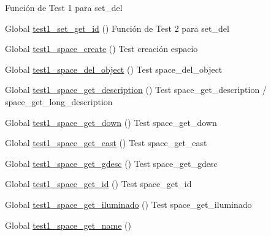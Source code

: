 \begin{DoxyRefList}
%
Función de Test 1 para set\+\_\+del  
\item[Global \mbox{\hyperlink{set__test_8c_af5b80896afe0d23ab4a347bdb4b3c48b}{test1\+\_\+set\+\_\+get\+\_\+id}} ()]\label{test__test000148}%
%
Función de Test 2 para set\+\_\+del  
\item[Global \mbox{\hyperlink{space__test_8c_a69278cc022dc5688d4725f8d36317b30}{test1\+\_\+space\+\_\+create}} ()]\label{test__test000150}%
%
Test creación espacio  
\item[Global \mbox{\hyperlink{space__test_8c_a871c964198bb9b8e085e4762654fdca1}{test1\+\_\+space\+\_\+del\+\_\+object}} ()]\label{test__test000177}%
%
Test space\+\_\+del\+\_\+object  
\item[Global \mbox{\hyperlink{space__test_8c_a9a9da97ed6f49f2ae325177caecfea9c}{test1\+\_\+space\+\_\+get\+\_\+description}} ()]\label{test__test000187}%
%
Test space\+\_\+get\+\_\+description / space\+\_\+get\+\_\+long\+\_\+description  
\item[Global \mbox{\hyperlink{space__test_8c_a31b56fea7bd46484d0e2e21dda7add5d}{test1\+\_\+space\+\_\+get\+\_\+down}} ()]\label{test__test000199}%
%
Test space\+\_\+get\+\_\+down  
\item[Global \mbox{\hyperlink{space__test_8c_a354adb2722b06ec65b7212d2736d6417}{test1\+\_\+space\+\_\+get\+\_\+east}} ()]\label{test__test000169}%
%
Test space\+\_\+get\+\_\+east  
\item[Global \mbox{\hyperlink{space__test_8c_a3b6d16613ee2f3940fe7c92f3934508a}{test1\+\_\+space\+\_\+get\+\_\+gdesc}} ()]\label{test__test000181}%
%
Test space\+\_\+get\+\_\+gdesc  
\item[Global \mbox{\hyperlink{space__test_8c_a920df9e02482f4f1e6a5ebcaec523860}{test1\+\_\+space\+\_\+get\+\_\+id}} ()]\label{test__test000173}%
%
Test space\+\_\+get\+\_\+id  
\item[Global \mbox{\hyperlink{space__test_8c_ad92c1bb6fd3d65db69b0984fd0a47cd2}{test1\+\_\+space\+\_\+get\+\_\+iluminado}} ()]\label{test__test000191}%
%
Test space\+\_\+get\+\_\+iluminado  
\item[Global \mbox{\hyperlink{space__test_8c_ad12c42523c517507566c5c68b1527689}{test1\+\_\+space\+\_\+get\+\_\+name}} ()]\label{test__test000163}%
%

\end{DoxyRefList}
